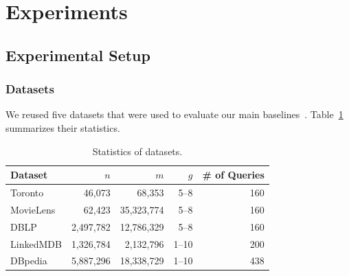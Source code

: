 \section{Experiments}
\label{sec: experiments}

\subsection{Experimental Setup}

\subsubsection{Datasets}
\label{sec:datasets}

We reused five datasets that were used to evaluate our main baselines~\cite{ImprovAPP,KeyKG}. Table~\ref{table: TF_KS_Graph} summarizes their statistics.

\begin{table}[t]
    \caption{Statistics of datasets.}
    \label{table: TF_KS_Graph}
    \centering
    \small
    \begin{tabular}{lrrrr}
        \toprule
        Dataset & $n$ & $m$ & $g$ & \# of Queries\\
        \midrule
        Toronto & 46,073 & 68,353 & 5--8 & 160\\
        MovieLens & 62,423 & 35,323,774  & 5--8 & 160 \\
        DBLP & 2,497,782 & 12,786,329 & 5--8 & 160 \\
        LinkedMDB & 1,326,784 & 2,132,796 & 1--10 & 200\\
        DBpedia & 5,887,296 & 18,338,729 & 1--10 & 438\\
        \bottomrule
    \end{tabular}
\end{table}


